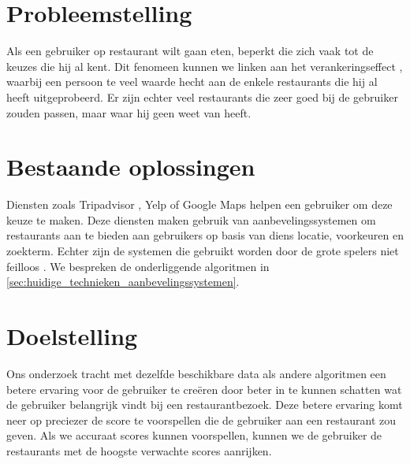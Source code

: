 
\section{Probleemstelling}
Als een gebruiker op restaurant wilt gaan eten, beperkt die zich vaak tot de keuzes die hij al kent. Dit fenomeen kunnen we linken aan het verankeringseffect \cite{anchoring_effect}, waarbij een persoon te veel waarde hecht aan de enkele restaurants die hij al heeft uitgeprobeerd. Er zijn echter veel restaurants die zeer goed bij de gebruiker zouden passen, maar waar hij geen weet van heeft.

\section{Bestaande oplossingen}
Diensten zoals Tripadvisor \cite{tripadvisor_algorithm}, Yelp of Google Maps helpen een gebruiker om deze keuze te maken. Deze diensten maken gebruik van aanbevelingssystemen om restaurants aan te bieden aan gebruikers op basis van diens locatie, voorkeuren en zoekterm. Echter zijn de systemen die gebruikt worden door de grote spelers niet feilloos \cite{spotify_recsys_bad}. We bespreken de onderliggende algoritmen in \autoref{sec:huidige_technieken_aanbevelingssystemen}.

\section{Doelstelling}
Ons onderzoek tracht met dezelfde beschikbare data als andere algoritmen een betere ervaring voor de gebruiker te creëren door beter in te kunnen schatten wat de gebruiker belangrijk vindt bij een restaurantbezoek. Deze betere ervaring komt neer op preciezer de score te voorspellen die de gebruiker aan een restaurant zou geven. Als we accuraat scores kunnen voorspellen, kunnen we de gebruiker de restaurants met de hoogste verwachte scores aanrijken.

